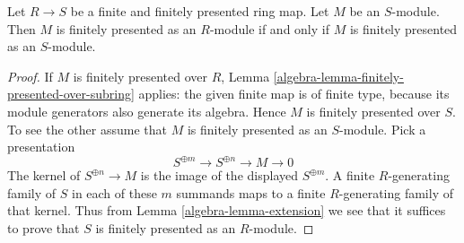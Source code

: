 \begin{lemma}
\label{editorial-source-lemma-finite-finitely-presented-extension}
Let $R \to S$ be a finite and finitely presented ring map.
Let $M$ be an $S$-module.
Then $M$ is finitely presented as an $R$-module if and only if
$M$ is finitely presented as an $S$-module.
\end{lemma}

\begin{proof}
If $M$ is finitely presented over $R$, Lemma
\ref{algebra-lemma-finitely-presented-over-subring} applies: the given finite
map is of finite type, because its module generators also generate
its algebra. Hence $M$ is finitely presented over $S$.
To see the other assume that $M$ is finitely presented as an $S$-module.
Pick a presentation
$$
S^{\oplus m} \longrightarrow
S^{\oplus n} \longrightarrow
M \longrightarrow 0
$$
The kernel of $S^{\oplus n}\to M$ is the image of the displayed
$S^{\oplus m}$. A finite $R$-generating family of $S$ in each of
these $m$ summands maps to a finite $R$-generating family of that
kernel. Thus from
Lemma \ref{algebra-lemma-extension}
we see that it suffices to prove that $S$ is finitely presented as an
$R$-module.


\end{proof}
